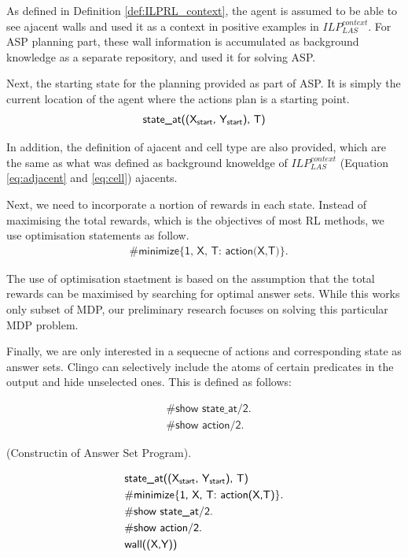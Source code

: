 As defined in Definition \ref{def:ILPRL_context}, the agent is assumed to be able to see ajacent walls and used it as a context in positive examples in $ILP_{LAS}^{context}$. 
For ASP planning part, these wall information is accumulated as background knowledge as a separate repository, and used it for solving ASP. 

Next, the starting state for the planning provided as part of ASP. It is simply the current location of the agent where the actions plan is a starting point.
\begin{equation}
\begin{split}
\textsf{state\_at((X\textsubscript{start}, Y\textsubscript{start}), T)}
\end{split}
\end{equation}

In addition, the definition of ajacent and cell type are also provided, which are the same as what was defined as background knoweldge of $ILP_{LAS}^{context}$ (Equation \ref{eq:adjacent} and \ref{eq:cell})
ajacents.

Next, we need to incorporate a nortion of rewards in each state. Instead of maximising the total rewards, which is the objectives of most RL methods, 
we use optimisation statements as follow. 
\begin{equation}
\begin{split}
&\textsf{\#minimize\{1, X, T: action(X,T)\}}.
\end{split}
\end{equation}

The use of optimisation staetment is based on the assumption that the total rewards can be maximised by searching for optimal answer sets. 
While this works only subset of MDP, our preliminary research focuses on solving this particular MDP problem. 
    
Finally, we are only interested in a sequecne of actions and corresponding state as answer sets. 
Clingo can selectively include the atoms of certain predicates in the output and hide unselected ones. 
This is defined as follows:

\begin{equation}
\begin{split}
&\textsf{\#show state\_at/2.} \\
&\textsf{\#show action/2.}
\end{split}
\end{equation}

\begin{examp} \normalfont (Constructin of Answer Set Program).

\begin{equation}
\begin{split}
&\textsf{state\_at((X\textsubscript{start}, Y\textsubscript{start}), T)}\\
&\textsf{\#minimize\{1, X, T: action(X,T)\}}.\\
&\textsf{\#show state\_at/2.} \\
&\textsf{\#show action/2.}\\
&\textsf{wall((X,Y))}
\end{split}
\end{equation}
\end{examp}

